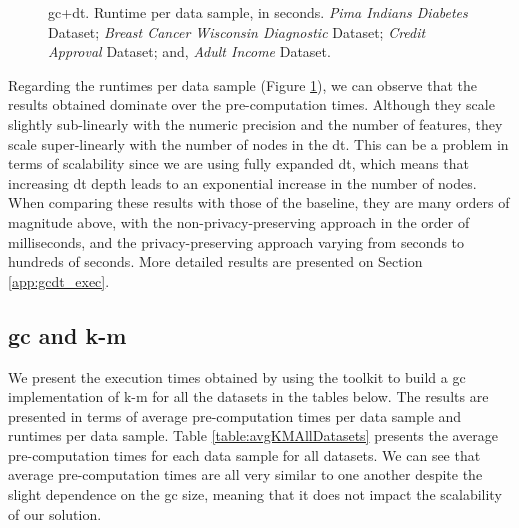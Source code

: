 \begin{figure}[!h]
\caption[\acs{gc}+\acs{dt}. Runtime per data sample, in seconds. All datasets.]{\acs{gc}+\acs{dt}. Runtime per data sample, in seconds.
 \emph{Pima Indians Diabetes} Dataset;
 \emph{Breast Cancer Wisconsin Diagnostic} Dataset;
 \emph{Credit Approval} Dataset; and,
 \emph{Adult Income} Dataset.}%
\label{fig:dt-gc}%
\end{figure}


Regarding the runtimes per data sample (Figure \ref{fig:dt-gc}), we can observe that the results obtained dominate over the pre-computation times. Although they scale slightly sub-linearly with the numeric precision and the number of features, they scale super-linearly with the number of nodes in the \ac{dt}. This can be a problem in terms of scalability since we are using fully expanded \ac{dt}, which means that increasing \ac{dt} depth leads to an exponential increase in the number of nodes. When comparing these results with those of the baseline, they are many orders of magnitude above, with the non-privacy-preserving approach in the order of milliseconds, and the privacy-preserving approach varying from seconds to hundreds of seconds. 
More detailed results are presented on Section \ref{app:gcdt_exec}.


\subsection{\acl{gc} and \acl{k-m}}
\label{ssec:gcandKM}


We present the execution times obtained by using the toolkit to build a \ac{gc} implementation of \ac{k-m} for all the datasets in the tables below. The results are presented in terms of average pre-computation times per data sample and runtimes per data sample. Table \ref{table:avgKMAllDatasets} presents the average pre-computation times for each data sample for all datasets. We can see that average pre-computation times are all very similar to one another despite the slight dependence on the \ac{gc} size, meaning that it does not impact the scalability of our solution.

